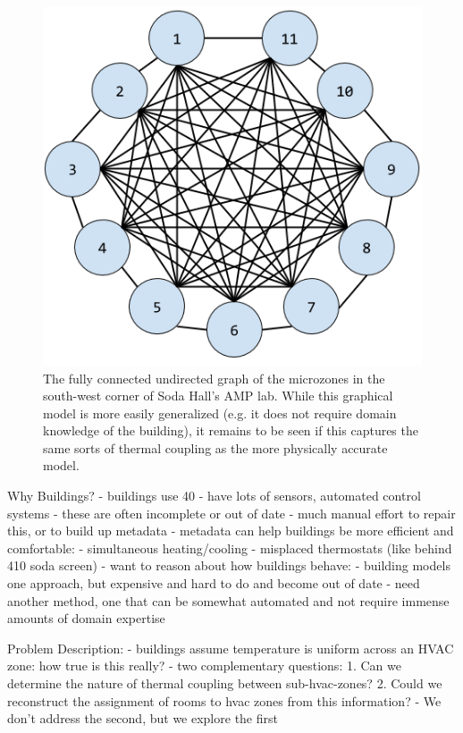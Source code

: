 \begin{figure}
\centering
\includegraphics[width=.5\linewidth]{figs/SodaFullEdgeGraph}
\caption{The fully connected undirected graph of the microzones in the south-west corner of Soda Hall's AMP lab. While this graphical model is more easily generalized (e.g. it does not require domain knowledge of the building), it remains to be seen if this captures the same sorts of thermal coupling as the more physically accurate model.}
\label{fig:physical_soda_edges}
\end{figure}


Why Buildings?
- buildings use 40%
    - have lots of sensors, automated control systems
    - these are often incomplete or out of date
    - much manual effort to repair this, or to build up metadata
    - metadata can help buildings be more efficient and comfortable:
        - simultaneous heating/cooling
        - misplaced thermostats (like behind 410 soda screen)
    - want to reason about how buildings behave:
      - building models one approach, but expensive and hard to do and become out of date
      - need another method, one that can be somewhat automated and not require
        immense amounts of domain expertise

Problem Description:
- buildings assume temperature is uniform across an HVAC zone: how true is this really?
    - two complementary questions:
      1. Can we determine the nature of thermal coupling between sub-hvac-zones?
      2. Could we reconstruct the assignment of rooms to hvac zones from this information?
    - We don't address the second, but we explore the first

\fi
